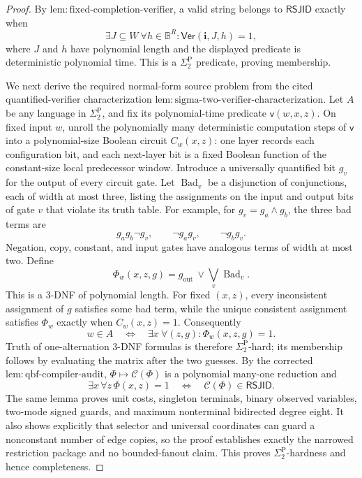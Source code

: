\documentclass{article}
\begin{document}
\begin{proof}
By \(\mathrm{lem{:}fixed\text{-}completion\text{-}verifier}\), a valid string belongs to \(\mathsf{RSJID}\) exactly when
\[
 \exists J\subseteq W\ \forall h\in\mathbb B^R:
 \mathsf{Ver}(\mathbf i,J,h)=1,
\]
where \(J\) and \(h\) have polynomial length and the displayed predicate is deterministic polynomial time.  This is a \(\Sigma_2^{\mathrm P}\) predicate, proving membership.

We next derive the required normal-form source problem from the cited quantified-verifier characterization \(\mathrm{lem{:}sigma\text{-}two\text{-}verifier\text{-}characterization}\).  Let \(A\) be any language in \(\Sigma_2^{\mathrm P}\), and fix its polynomial-time predicate \(\mathsf v(w,x,z)\).  On fixed input \(w\), unroll the polynomially many deterministic computation steps of \(\mathsf v\) into a polynomial-size Boolean circuit \(C_w(x,z)\): one layer records each configuration bit, and each next-layer bit is a fixed Boolean function of the constant-size local predecessor window.  Introduce a universally quantified bit \(g_v\) for the output of every circuit gate.  Let \(\operatorname{Bad}_v\) be a disjunction of conjunctions, each of width at most three, listing the assignments on the input and output bits of gate \(v\) that violate its truth table.  For example, for \(g_v=g_a\wedge g_b\), the three bad terms are
\[
 g_a g_b\neg g_v,\qquad \neg g_a g_v,\qquad \neg g_b g_v.
\]
Negation, copy, constant, and input gates have analogous terms of width at most two.  Define
\[
 \Phi_w(x,z,g)=g_{\mathrm{out}}\ \vee\!\bigvee_v\operatorname{Bad}_v.
\]
This is a \(3\)-DNF of polynomial length.  For fixed \((x,z)\), every inconsistent assignment of \(g\) satisfies some bad term, while the unique consistent assignment satisfies \(\Phi_w\) exactly when \(C_w(x,z)=1\).  Consequently
\[
 w\in A
 \quad\Longleftrightarrow\quad
 \exists x\ \forall(z,g):\Phi_w(x,z,g)=1.
\]
Truth of one-alternation \(3\)-DNF formulas is therefore \(\Sigma_2^{\mathrm P}\)-hard; its membership follows by evaluating the matrix after the two guesses.  By the corrected \(\mathrm{lem{:}qbf\text{-}compiler\text{-}audit}\), \(\Phi\mapsto\mathcal C(\Phi)\) is a polynomial many-one reduction and
\[
 \exists x\,\forall z\,\Phi(x,z)=1
 \quad\Longleftrightarrow\quad
 \mathcal C(\Phi)\in\mathsf{RSJID}.
\]
The same lemma proves unit costs, singleton terminals, binary observed variables, two-mode signed guards, and maximum nonterminal bidirected degree eight.  It also shows explicitly that selector and universal coordinates can guard a nonconstant number of edge copies, so the proof establishes exactly the narrowed restriction package and no bounded-fanout claim.  This proves \(\Sigma_2^{\mathrm P}\)-hardness and hence completeness.


\end{proof}
\end{document}
